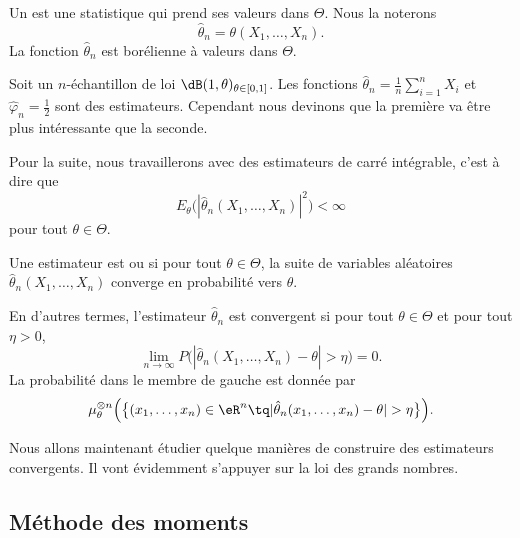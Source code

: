 Un  est une statistique qui prend ses valeurs dans \( \Theta\). Nous la noterons
\begin{equation}
    \hat\theta_n=\theta(X_1,\ldots,X_n).
\end{equation}
La fonction \( \hat\theta_n\) est borélienne à valeurs dans \( \Theta\).

\begin{example}
    Soit un \( n\)-échantillon de loi \( \dB(1,\theta)_{\theta\in\mathopen[ 0 , 1 \mathclose]}\). Les fonctions \( \hat\theta_n=\frac{1}{ n }\sum_{i=1}^nX_i\) et \( \hat\varphi_n=\frac{ 1 }{2}\) sont des estimateurs. Cependant nous devinons que la première va être plus intéressante que la seconde.
\end{example}

Pour la suite, nous travaillerons avec des estimateurs de carré intégrable, c'est à dire que
\begin{equation}
    E_{\theta}\big( | \hat\theta_n(X_1,\ldots,X_n) |^2 \big)<\infty
\end{equation}
pour tout \( \theta\in\Theta\).

\begin{definition}
    Une estimateur est  ou  si pour tout \( \theta\in\Theta\), la suite de variables aléatoires \( \hat\theta_n(X_1,\ldots,X_n)\) converge en probabilité vers \( \theta\).
\end{definition}
En d'autres termes, l'estimateur \( \hat\theta_n\) est convergent si pour tout \( \theta\in\Theta\) et pour tout \( \eta>0\),
\begin{equation}
    \lim_{n\to \infty} P\big( | \hat\theta_n(X_1,\ldots,X_n)-\theta |>\eta \big)=0.
\end{equation}
La probabilité dans le membre de gauche est donnée par
\begin{equation}
    \mu^{\otimes n}_{\theta}\Big( \big\{ (x_1,\ldots,x_n)\in\eR^n\tq| \hat\theta_n(x_1,\ldots,x_n)-\theta |>\eta \big\} \Big).
\end{equation}

Nous allons maintenant étudier quelque manières de construire des estimateurs convergents. Il vont évidemment s'appuyer sur la loi des grands nombres.

\subsection{Méthode des moments}

